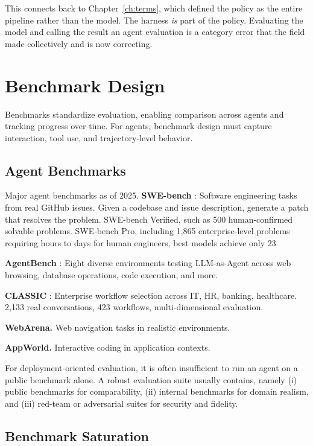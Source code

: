 This connects back to Chapter~\ref{ch:terms}, which defined the policy as the
entire pipeline rather than the model. The harness \emph{is} part of the policy.
Evaluating the model and calling the result an agent evaluation is a category
error that the field made collectively and is now correcting.

\section{Benchmark Design}

Benchmarks standardize evaluation, enabling comparison across agents and tracking progress over time. For agents, benchmark design must capture interaction, tool use, and trajectory-level behavior.

\subsection{Agent Benchmarks}

Major agent benchmarks as of 2025. \textbf{SWE-bench} \cite{swebench2024}: Software engineering tasks from real GitHub issues. Given a codebase and issue description, generate a patch that resolves the problem. SWE-bench Verified, such as 500 human-confirmed solvable problems. SWE-bench Pro, including 1,865 enterprise-level problems requiring hours to days for human engineers, best models achieve only 23%

\textbf{AgentBench} \cite{agentbench2023}: Eight diverse environments testing LLM-as-Agent across web browsing, database operations, code execution, and more.

\textbf{CLASSIC} \cite{classic2025}: Enterprise workflow selection across IT, HR, banking, healthcare. 2,133 real conversations, 423 workflows, multi-dimensional evaluation.

\textbf{WebArena.} Web navigation tasks in realistic environments.

\textbf{AppWorld.} Interactive coding in application contexts.

For deployment-oriented evaluation, it is often insufficient to run an agent on a public benchmark alone. A robust evaluation suite usually contains, namely (i) public benchmarks for comparability, (ii) internal benchmarks for domain realism, and (iii) red-team or adversarial suites for security and fidelity.

\subsection{Benchmark Saturation}

